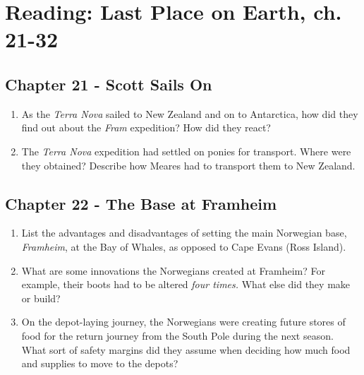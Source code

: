 \documentclass[10pt]{article}
\begin{document}
\twocolumn
\maketitle

\section{Reading: Last Place on Earth, ch. 21-32}

\subsection{Chapter 21 - Scott Sails On}

\begin{enumerate}
\item As the \textit{Terra Nova} sailed to New Zealand and on to Antarctica, how did they find out about the \textit{Fram} expedition?  How did they react? \\ \vspace{1.5cm}
\item The \textit{Terra Nova} expedition had settled on ponies for transport.  Where were they obtained?  Describe how Meares had to transport them to New Zealand. \\ \vspace{1.5cm}
\end{enumerate}

\subsection{Chapter 22 - The Base at Framheim}

\begin{enumerate}
\item List the advantages and disadvantages of setting the main Norwegian base, \textit{Framheim}, at the Bay of Whales, as opposed to Cape Evans (Ross Island). \\ \vspace{1.5cm}
\item What are some innovations the Norwegians created at Framheim?  For example, their boots had to be altered \textit{four times.}  What else did they make or build? \\ \vspace{1.5cm}
\item On the depot-laying journey, the Norwegians were creating future stores of food for the return journey from the South Pole during the next season.  What sort of safety margins did they assume when deciding how much food and supplies to move to the depots? \\ \vspace{1.5cm}
\end{enumerate}
\end{document}
